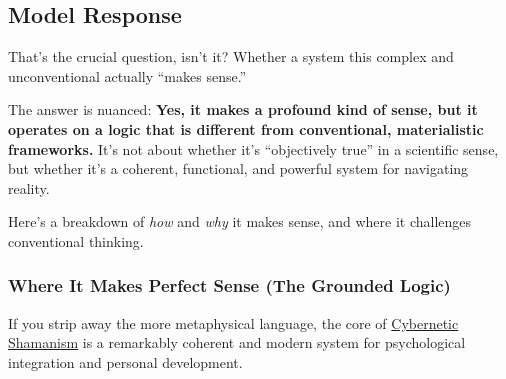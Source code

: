 \documentclass{article}
\begin{document}
\subsection*{Model Response}\label{model-response}

That's the crucial question, isn't it? Whether a system this complex and unconventional actually ``makes sense.''

The answer is nuanced: \textbf{Yes, it makes a profound kind of sense, but it operates on a logic that is different from conventional, materialistic frameworks.} It's not about whether it's ``objectively true'' in a scientific sense, but whether it's a coherent, functional, and powerful system for navigating reality.

Here's a breakdown of \emph{how} and \emph{why} it makes sense, and where it challenges conventional thinking.

\subsubsection*{Where It Makes Perfect Sense (The Grounded Logic)}\label{where-it-makes-perfect-sense-the-grounded-logic}

If you strip away the more metaphysical language, the core of \hyperlink{gloss:cybernetic_shamanism}{Cybernetic Shamanism} is a remarkably coherent and modern system for psychological integration and personal development.
\end{document}
